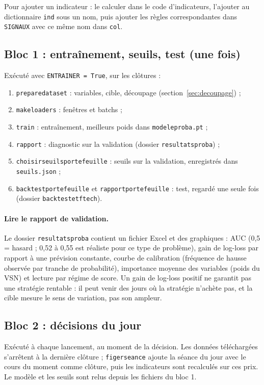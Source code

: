 \documentclass[11pt,a4paper]{article}
\renewcommand{\_}{\usorig\allowbreak}   %
\newcommand{\f}[1]{\texttt{#1}}        %
\begin{document}
\noindent Pour ajouter un indicateur : le calculer dans le code d'indicateurs, l'ajouter
au dictionnaire \f{ind} sous un nom, puis ajouter les règles correspondantes dans
\f{SIGNAUX} avec ce même nom dans \f{col}.

\subsection{Bloc 1 : entraînement, seuils, test (une fois)}
Exécuté avec \f{ENTRAINER = True}, sur les clôtures :
\begin{enumerate}[nosep]
  \item \f{prepare\_dataset} : variables, cible, découpage (section~\ref{sec:decoupage}) ;
  \item \f{make\_loaders} : fenêtres et batchs ;
  \item \f{train} : entraînement, meilleurs poids dans \f{modele\_proba.pt} ;
  \item \f{rapport} : diagnostic sur la validation (dossier \f{resultats\_proba}) ;
  \item \f{choisir\_seuils\_portefeuille} : seuils sur la validation, enregistrés dans \f{seuils.json} ;
  \item \f{backtest\_portefeuille} et \f{rapport\_portefeuille} : test, regardé une seule fois
  (dossier \f{backtest\_etf\_tech}).
\end{enumerate}

\paragraph{Lire le rapport de validation.} Le dossier \f{resultats\_proba} contient un
fichier Excel et des graphiques : AUC (0,5 = hasard ; 0,52 à 0,55 est réaliste pour ce
type de problème), gain de log-loss par rapport à une prévision constante, courbe de
calibration (fréquence de hausse observée par tranche de probabilité), importance moyenne
des variables (poids du VSN) et lecture par régime de score. Un gain de log-loss positif
ne garantit pas une stratégie rentable : il peut venir des jours où la stratégie
n'achète pas, et la cible mesure le sens de variation, pas son ampleur.

\subsection{Bloc 2 : décisions du jour}
Exécuté à chaque lancement, au moment de la décision. Les données téléchargées s'arrêtent
à la dernière clôture ; \f{figer\_seance} ajoute la séance du jour avec le cours du moment
comme clôture, puis les indicateurs sont recalculés sur ces prix. Le modèle et les seuils
sont relus depuis les fichiers du bloc 1.
\end{document}
